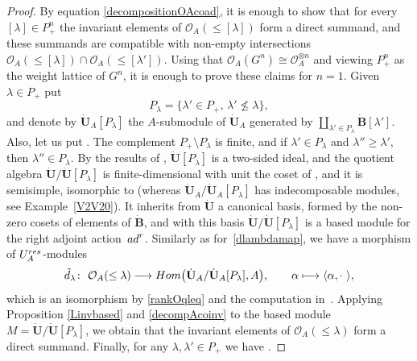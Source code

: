 \documentclass[11pt]{article}
\numberwithin{equation}{section}
\numberwithin{equation}{section}
\theoremstyle{definition}
\newcommand{\mc}{\mathbb{C}}
\newcommand{\Oo}{{\mathcal O}}
\begin{document}
\begin{proof} By equation \eqref{decompositionOAcoad}, it is enough to show that for every $[\lambda]\in P_+^n$ the invariant elements of $\Oo_A(\leq [\lambda])$ form a direct summand, and these summands are compatible with non-empty intersections $\Oo_A(\leq [\lambda]) \cap \Oo_A(\leq [\lambda'])$. Using that $\Oo_A(G^n) \cong \Oo_A^{\otimes n}$ and viewing $P_+^n$ as the weight lattice of $G^n$, it is enough to prove these claims for $n=1$. Given $\lambda\in P_+$ put
\[P_{\lambda} = \{\lambda'\in P_+, \, \lambda' \nleqslant \lambda\},\]
and denote by $\dot{\mathbf{U}}_A [P_\lambda]$ the $A$-submodule of $\dot{\mathbf{U}}_A$ generated by $\coprod_{\lambda' \in P_\lambda} \dot{\mathbf{B}} [\lambda']$. Also, let us put \smash{$\dot{\mathbf{U}} [P_\lambda]= \dot{\mathbf{U}}_A [P_\lambda]\bigotimes_A \mc(q)$}.
The complement $P_+\setminus P_{\lambda}$ is finite, and if $\lambda'\in P_{\lambda}$ and $\lambda''\geq \lambda'$, then $\lambda''\in P_{\lambda}$. By the results of \cite[Section~29.2]{Lusztig}, $ \dot{\mathbf{U}} [P_\lambda]$ is a two-sided ideal, and the quotient algebra $\dot{\mathbf{U}} / \dot{\mathbf{U}} [P_\lambda]$ is finite-dimensional with unit the coset of , and it is semisimple, isomorphic to  (whereas $\dot{\mathbf{U}}_A / \dot{\mathbf{U}}_A [P_\lambda]$ has indecomposable modules, see Example~\ref{V2V20}).
It inherits from $\dot{\mathbf{U}}$ a canonical basis, formed by the non-zero cosets of elements of $\dot{\mathbf{B}}$, and with this basis $\dot{\mathbf{U}} / \dot{\mathbf{U}} [P_\lambda]$ is a based module for the right adjoint action~${\rm ad}^r$. Similarly as for~\eqref{dlambdamap}, we have a morphism of $U_A^{\rm res}$-modules
\[
\tilde{d}_\lambda\colon\ \Oo_A(\leq \lambda)\longrightarrow {\rm Hom} \big( \dot{\mathbf{U}}_A / \dot{\mathbf{U}}_A [P_\lambda],A\big),\qquad \alpha\longmapsto\langle \alpha , \cdot \ \rangle,\]
which is an isomorphism by \eqref{rankOqleq} and the computation  in~\cite[Section~29.2]{Lusztig}. Applying Proposition \ref{Linvbased} and \eqref{decompAcoinv} to the based module ${M=\dot{\mathbf{U}} / \dot{\mathbf{U}} [P_\lambda]}$, we obtain that the invariant elements of $\Oo_A(\leq \lambda)$ form a direct summand. Finally, for any ${\lambda,\lambda'\!\in\! P_+}$ we have \smash{$\Oo_A(\leq \! \lambda) \cap \Oo_A(\leq \! \lambda')\cong {\rm Hom} \bigl( \dot{\mathbf{U}}_A \!/\bigl(\dot{\mathbf{U}}_A [P_\lambda]+ \dot{\mathbf{U}}_A [P_{\lambda'}]\bigr),A\bigr)$}.

\end{proof}
\end{document}
